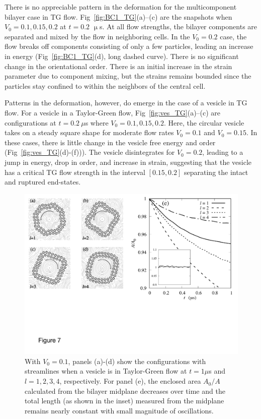 \documentclass[prb,preprint,showpacs,preprintnumbers,amsmath,amssymb,longbibliography]{revtex4-1}
\begin{document}
There is no appreciable pattern in the deformation for the multicomponent bilayer case in TG flow. 
Fig~\ref{fig:BC1_TG}(a)--(c) are the snapshots when $V_0=0.1,0.15,0.2$ at $t = 0.2$ $\upmu$s.
At all flow strengths, the bilayer components are separated and mixed by the flow in neighboring cells. 
In the $V_0 = 0.2$ case, the flow breaks off components consisting of only a few particles,
leading an increase in energy (Fig~\ref{fig:BC1_TG}(d), long dashed curve).
There is no significant change in the orientational order.  There is an initial increase in the
strain parameter due to component mixing, but the strains remains bounded since the particles
stay confined to within the neighbors of the central cell.  


Patterns in the deformation, however, do emerge in the case of a vesicle in TG flow.
For a vesicle in a Taylor-Green flow, Fig~\ref{fig:ves_TG}(a)--(c) are configurations at $t=0.2\  \mu$s where $V_0=0.1,0.15,0.2$.
Here, the circular vesicle takes on a steady square shape for moderate flow rates $V_0 = 0.1$ and $V_0 = 0.15$.
In these cases, there is little change in the vesicle free energy and order (Fig~\ref{fig:ves_TG}(d)-(f))).
The vesicle disintegrates for $V_0 = 0.2$, leading to a jump in energy, drop in order, and increase in strain,
suggesting that the vesicle has a critical TG flow strength in the interval $[0.15, 0.2]$ separating the
intact and ruptured end-states.

\begin{figure}
  \begin{center}
\includegraphics[width=1.0\textwidth]{Figures/Figure7.pdf}
  \end{center}
  \vspace{-20pt}  
  \caption{\label{fig:BTG_Scale} With $V_0=0.1$, panels (a)-(d) show the configurations with streamlines when a vesicle is in Taylor-Green flow at $t=1 \mu$s and $l= 1,2,3,4$, respectively.
  For panel (e), the enclosed area $A_0/A$ calculated from the bilayer midplane decreases over time and the total length (as shown in the inset) measured from the midplane remains nearly constant with small magnitude of oscillations.
  }
\end{figure}
\end{document}
